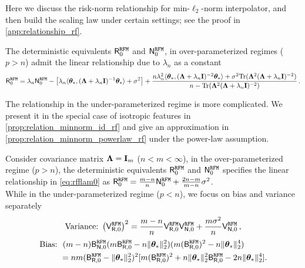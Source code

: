 Here we discuss the risk-norm relationship for min-$\ell_2$-norm interpolator, and then build the scaling law under certain settings; see the proof in \cref{app:relationship_rf}.
\begin{proposition}\label{prop:relation_minnorm_overparam}
The deterministic equivalents $\mathsf R^{\tt RFM}_{0}$ and $\mathsf N^{\tt RFM}_{0}$, in over-parameterized regimes ($p>n$) admit the linear relationship due to $\lambda_n$ as a constant
\begin{equation}\label{eq:rfflam0}
    \mathsf R_{0}^{\tt RFM} 
    = 
    \lambda_n\mathsf N_{0}^{\tt RFM} 
    - 
    \left[\lambda_n\langle{\boldsymbol \theta}_*, ( {\boldsymbol \Lambda} + \lambda_n{\mathbf I})^{-1} {\boldsymbol \theta}_*\rangle + \sigma^2\right] 
    + 
    \frac{n\lambda_n^2 \langle{\boldsymbol \theta}_*, ( {\boldsymbol \Lambda} + \lambda_n {\mathbf I})^{-2} {\boldsymbol \theta}_*\rangle + \sigma^2{\rm Tr}({\boldsymbol \Lambda}^2({\boldsymbol \Lambda}+\lambda_n{\mathbf I})^{-2})}{ n - {\rm Tr}({\boldsymbol \Lambda}^2({\boldsymbol \Lambda}+\lambda_n{\mathbf I})^{-2})}\,. 
\end{equation}
\end{proposition}

The relationship in the under-parameterized regime is more complicated. We present it in the special case of isotropic features in \cref{prop:relation_minnorm_id_rf} and give an approximation in \cref{prop:relation_minnorm_powerlaw_rf} under the power-law assumption.

\begin{corollary}\label{prop:relation_minnorm_id_rf}
    Consider covariance matrix ${\boldsymbol \Lambda} = {\mathbf I}_m$ ($n<m<\infty$), in the over-parameterized regime ($p>n$), the deterministic equivalents $\mathsf R^{\tt RFM}_0$ and $\mathsf N^{\tt RFM}_0$ specifies the linear relationship in \cref{eq:rfflam0} as $\mathsf R_{0}^{\tt RFM} = \frac{m-n}{n} \mathsf N_{0}^{\tt RFM} +\frac{2n-m}{m-n} \sigma^2$.\\
While in the under-parameterized regime ($p<n$), we focus on bias and variance separately
    \[
    \begin{aligned}
     \mbox{Variance:}~ \left(\mathsf V^{\tt RFM}_{\mathsf R,0} \right)^2 = \frac{m-n}{n} \mathsf V^{\tt RFM}_{\mathsf R,0} \mathsf V^{\tt RFM}_{\mathsf N,0} + \frac{m \sigma^2}{n} \mathsf V^{\tt RFM}_{\mathsf N,0}\,,
    \end{aligned}
    \]
    \[
    \begin{aligned}
      \mbox{Bias:}~  &~(m-n)\mathsf B^{\tt RFM}_{\mathsf N,0}(m\mathsf B^{\tt RFM}_{\mathsf R,0}-n\|{\boldsymbol \theta}_*\|_2^2)(m(\mathsf B^{\tt RFM}_{\mathsf R,0})^2-n\|{\boldsymbol \theta}_*\|_2^4)\\
        &= nm(\mathsf B^{\tt RFM}_{\mathsf R,0} -\|{\boldsymbol \theta}_*\|_2^2)^2[m(\mathsf B^{\tt RFM}_{\mathsf R,0})^2 + n\|{\boldsymbol \theta}_*\|_2^2\mathsf B^{\tt RFM}_{\mathsf R,0} - 2n\|{\boldsymbol \theta}_*\|_2^4].
    \end{aligned}
    \]
\end{corollary}

